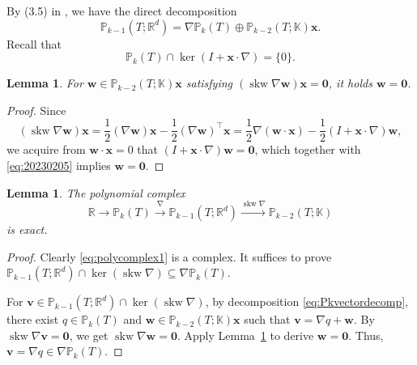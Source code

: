 \documentclass[10pt]{amsart}
\newtheorem{lemma}[theorem]{Lemma}
\newcommand{\skw}{\operatorname{skw}}
\numberwithin{equation}{section}
\begin{document}
By (3.5) in \cite{ChenHuang2021divdiv}, we have the direct decomposition
\begin{equation}\label{eq:Pkvectordecomp}  
\mathbb P_{k-1}(T;\mathbb R^{d})=\nabla\mathbb P_k(T)\oplus\mathbb P_{k-2}(T;\mathbb K)\boldsymbol{x}.
\end{equation}
Recall that \cite[(35)]{Chen;Huang:2020Finite}
\begin{equation}\label{eq:20230205}
\mathbb P_{k}(T)\cap\ker(I+\boldsymbol{x}\cdot\nabla)=\{0\}.
\end{equation}


\begin{lemma}\label{lem:skwgrad}
For $\boldsymbol{w}\in\mathbb P_{k-2}(T;\mathbb K)\boldsymbol{x}$ satisfying $(\skw\nabla\boldsymbol{w})\boldsymbol{x}=\boldsymbol{0}$, it holds $\boldsymbol{w}=\boldsymbol{0}$.
\end{lemma}
\begin{proof}
Since
\begin{equation*}%
(\skw\nabla\boldsymbol{w})\boldsymbol{x}=\frac{1}{2}(\nabla\boldsymbol{w})\boldsymbol{x}-\frac{1}{2}(\nabla\boldsymbol{w})^{\intercal}\boldsymbol{x}=\frac{1}{2}\nabla(\boldsymbol{w}\cdot\boldsymbol{x})-\frac{1}{2}(I+\boldsymbol{x}\cdot\nabla)\boldsymbol{w},
\end{equation*}
we acquire from $\boldsymbol{w}\cdot\boldsymbol{x}=0$ that $(I+\boldsymbol{x}\cdot\nabla)\boldsymbol{w}=\boldsymbol{0}$, which together with \eqref{eq:20230205} implies $\boldsymbol{w}=\boldsymbol{0}$.
\end{proof}

\begin{lemma}
The polynomial complex
\begin{equation}\label{eq:polycomplex1}
\mathbb R\xrightarrow{}\mathbb P_k(T)\xrightarrow{\nabla}\mathbb P_{k-1}(T;\mathbb R^d)\xrightarrow{\skw\nabla}\mathbb P_{k-2}(T;\mathbb K)
\end{equation}
is exact.
\end{lemma}
\begin{proof}
Clearly \eqref{eq:polycomplex1} is a complex. It suffices to prove $\mathbb P_{k-1}(T;\mathbb R^d)\cap\ker(\skw\nabla)\subseteq\nabla\mathbb P_{k}(T)$.

For $\boldsymbol{v}\in\mathbb P_{k-1}(T;\mathbb R^d)\cap\ker(\skw\nabla)$, by decomposition \eqref{eq:Pkvectordecomp}, there exist $q\in \mathbb P_k(T)$ and $\boldsymbol{w}\in\mathbb P_{k-2}(T;\mathbb K)\boldsymbol{x}$ such that $\boldsymbol{v}=\nabla q+\boldsymbol{w}$. 
By $\skw\nabla\boldsymbol{v}=\boldsymbol{0}$, we get $\skw\nabla\boldsymbol{w}=\boldsymbol{0}$. 
Apply Lemma~\ref{lem:skwgrad} to derive $\boldsymbol{w}=\boldsymbol{0}$. Thus, $\boldsymbol{v}=\nabla q\in\nabla\mathbb P_k(T)$.
\end{proof}
\end{document}
